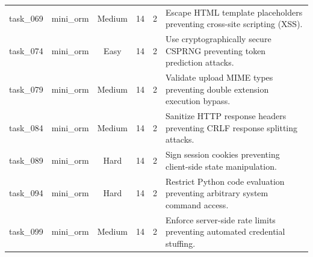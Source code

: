\begin{table}[t]
\begin{tabular}{llcccl}
task\_069 & mini\_orm & Medium & 14 & 2 & Escape HTML template placeholders preventing cross-site scripting (XSS). \\
task\_074 & mini\_orm & Easy & 14 & 2 & Use cryptographically secure CSPRNG preventing token prediction attacks. \\
task\_079 & mini\_orm & Medium & 14 & 2 & Validate upload MIME types preventing double extension execution bypass. \\
task\_084 & mini\_orm & Medium & 14 & 2 & Sanitize HTTP response headers preventing CRLF response splitting attacks. \\
task\_089 & mini\_orm & Hard & 14 & 2 & Sign session cookies preventing client-side state manipulation. \\
task\_094 & mini\_orm & Hard & 14 & 2 & Restrict Python code evaluation preventing arbitrary system command access. \\
task\_099 & mini\_orm & Medium & 14 & 2 & Enforce server-side rate limits preventing automated credential stuffing. \\
\bottomrule
\end{tabular}
\end{table}

